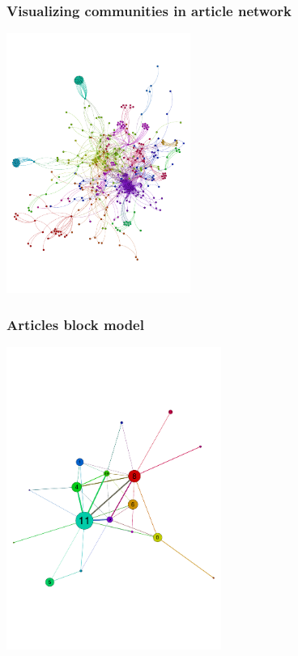 \documentclass[xcolor=dvipsnames, 9pt]{beamer}
\begin{document}
\begin{frame}[fragile]
    \frametitle{Visualizing communities in article network}
    \begin{center}
        \includegraphics[width=6cm]{../images/articles_spinglass_colored.pdf}
    \end{center}
\end{frame}

\begin{frame}[fragile]
    \frametitle{Articles block model}
    \begin{center}
        \includegraphics[width=7cm,clip,trim=0cm 4cm 0cm 4cm]{../images/articles_spinglass_blocked.pdf}
    \end{center}
\end{frame}
\end{document}
